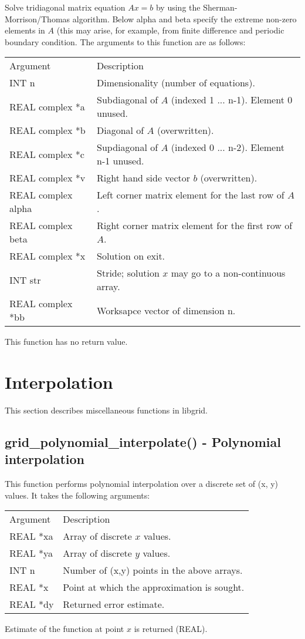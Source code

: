 \documentclass[12pt,letterpaper]{report}
\begin{document}
Solve tridiagonal matrix equation $Ax = b$ by using the Sherman-Morrison/Thomas algorithm. Below alpha and beta specify the extreme non-zero elements in $A$ (this may arise, for example, from finite difference and periodic boundary condition. The arguments to this function are as follows:
\begin{longtable}{p{} p{}}
Argument & Description\\
\cline{1-2}
INT n & Dimensionality (number of equations).\\
REAL complex *a & Subdiagonal of $A$ (indexed 1 ... n-1). Element 0 unused.\\
REAL complex *b & Diagonal of $A$ (overwritten).\\
REAL complex *c & Supdiagonal of $A$ (indexed 0 ... n-2). Element n-1 unused.\\
REAL complex *v & Right hand side vector $b$ (overwritten).\\
REAL complex alpha & Left corner matrix element for the last row of $A$.\\
REAL complex beta  & Right corner matrix element for the first row of $A$.\\
REAL complex *x & Solution on exit.\\
INT str & Stride; solution $x$ may go to a non-continuous array.\\
REAL complex *bb & Worksapce vector of dimension n.\\
\end{longtable}
\noindent
This function has no return value.

\section{Interpolation}

This section describes miscellaneous functions in libgrid.

\subsection{grid\_polynomial\_interpolate() - Polynomial interpolation}

This function performs polynomial interpolation over a discrete set of (x, y) values. It takes the following arguments:
\begin{longtable}{p{} p{}}
Argument & Description\\
\cline{1-2}
REAL *xa & Array of discrete $x$ values.\\
REAL *ya & Array of discrete $y$ values.\\  
INT n & Number of (x,y) points in the above arrays.\\
REAL *x & Point at which the approximation is sought.\\
REAL *dy & Returned error estimate.\\
\end{longtable}
\noindent
Estimate of the function at point $x$ is returned (REAL).
\end{document}
